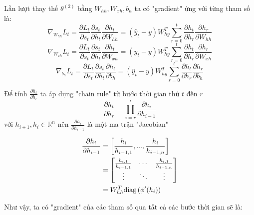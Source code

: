 Lần lượt thay thế $\theta^{(2)}$ bằng $W_{hh}, W_{xh}, b_h$ ta có "gradient" ứng với từng tham số là:
\begin{equation} \label{gradientWRTSt12}
\nabla_{W_{hh}}L_t = \frac{\partial L_t}{\partial s_t} \frac{\partial s_t}{\partial h_t} \frac{\partial h_t}{\partial W_{hh}}  =  (\hat{y}_t - y) W_{hy}^T \sum_{r=0}^{t} \frac{\partial h_{t}}{\partial h_r} \frac{\partial h_r}{\partial W_{hh}}
\end{equation}
\begin{equation} \label{gradientWRTSt13}
\nabla_{W_{xh}}L_t = \frac{\partial L_t}{\partial s_t} \frac{\partial s_t}{\partial h_t} \frac{\partial h_t}{\partial W_{xh}}  =  (\hat{y}_t - y) W_{hy}^T \sum_{r=0}^{t} \frac{\partial h_{t}}{\partial h_r} \frac{\partial h_r}{\partial W_{xh}}
\end{equation}
\begin{equation} \label{gradientWRTSt14}
\nabla_{b_h}L_t = \frac{\partial L_t}{\partial s_t} \frac{\partial s_t}{\partial h_t} \frac{\partial h_t}{\partial b_h}  =  (\hat{y}_t - y) W_{hy}^T \sum_{r=0}^{t} \frac{\partial h_{t}}{\partial h_r} \frac{\partial h_r}{\partial b_h}
\end{equation}

Để tính $\frac{\partial h_t}{\partial h_r}$ ta áp dụng "chain rule" từ bước thời gian thứ $t$ đến $r$
\begin{equation} \label{gradientWRTSt15}
\frac{\partial h_t}{\partial h_r} = \prod_{i=r}^{t} \frac{\partial h_{i}}{\partial h_{i-1}}
\end{equation}
với $h_{i+1},h_i \in \mathbb{R}^n$ nên $\frac{\partial h_{i}}{\partial h_{i-1}}$ là một ma trận "Jacobian"

\begin{equation} \label{gradientWRTSt16}
\begin{split}
\frac{\partial h_{i}}{\partial h_{i-1}} &= \left[ \frac{h_{i}}{h_{i-1,1}}, ..., \frac{h_{i}}{h_{i-1,n}} \right] \\
&= \begin{bmatrix}
\frac{h_{i, 1}}{h_{i-1,1}} & \cdots & \frac{h_{i,1}}{h_{i-1,n}}\\
\vdots & \ddots & \vdots\\
\end{bmatrix} \\
&= W_{hh}^T \mathrm{diag} \left( \phi'(h_i) \right)
\end{split} 
\end{equation}

Như vậy, ta có "gradient" của các tham số qua tất cả các bước thời gian sẽ là:

